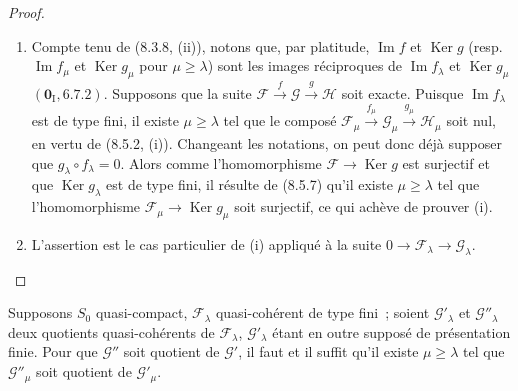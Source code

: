 \begin{proof}
\begin{enumerate}[label=(\roman*)]
  \item Compte tenu de (8.3.8, (ii)), notons que, par platitude,
  $\operatorname{Im}f$ et $\operatorname{Ker}g$ (resp.
  $\operatorname{Im}f_\mu$ et $\operatorname{Ker}g_\mu$ pour
  $\mu\geq\lambda$) sont les images réciproques de
  $\operatorname{Im}f_\lambda$ et $\operatorname{Ker}g_\mu$
  $(\mathbf{0}_{\mathrm I},6.7.2)$. Supposons que la suite
  $\mathcal F\xrightarrow{f}\mathcal G\xrightarrow{g}\mathcal H$ soit exacte.
  Puisque $\operatorname{Im}f_\lambda$ est de type fini, il existe
  $\mu\geq\lambda$ tel que le composé
  $\mathcal F_\mu\xrightarrow{f_\mu}\mathcal G_\mu
  \xrightarrow{g_\mu}\mathcal H_\mu$ soit nul, en vertu de (8.5.2, (i)).
  Changeant les notations, on peut donc déjà supposer que
  $g_\lambda\circ f_\lambda=0$. Alors comme l'homomorphisme
  $\mathcal F\to\operatorname{Ker}g$ est surjectif et que
  $\operatorname{Ker}g_\lambda$ est de type fini, il résulte de (8.5.7) qu'il
  existe $\mu\geq\lambda$ tel que l'homomorphisme
  $\mathcal F_\mu\to\operatorname{Ker}g_\mu$ soit surjectif, ce qui achève de
  prouver (i).

  \item L'assertion est le cas particulier de (i) appliqué à la suite
  $0\to\mathcal F_\lambda\to\mathcal G_\lambda$.
\end{enumerate}
\end{proof}

\begin{lemma}[8.5.9]
\label{IV.8.5.9-fr}
Supposons $S_0$ quasi-compact, $\mathcal F_\lambda$ quasi-cohérent de type
fini~; soient $\mathcal G'_\lambda$ et $\mathcal G''_\lambda$ deux quotients
quasi-cohérents de $\mathcal F_\lambda$, $\mathcal G'_\lambda$ étant en outre
supposé de présentation finie. Pour que $\mathcal G''$ soit quotient de
$\mathcal G'$, il faut et il suffit qu'il existe $\mu\geq\lambda$ tel que
$\mathcal G''_\mu$ soit quotient de $\mathcal G'_\mu$.
\end{lemma}

